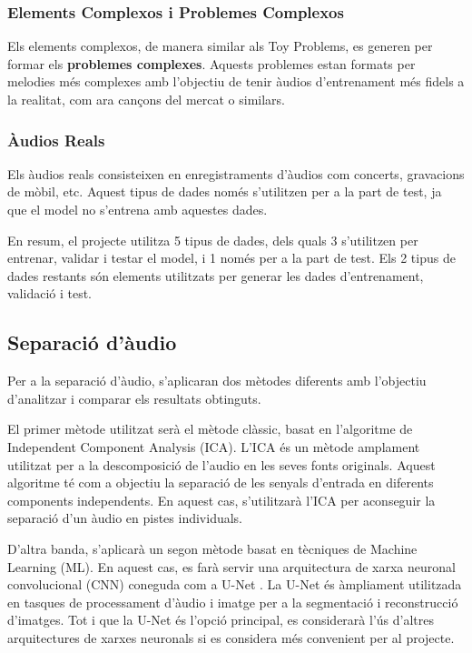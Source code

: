 \documentclass[10pt,a4paper,twocolumn,twoside]{article}
\begin{document}
\subsubsection{Elements Complexos i Problemes Complexos}

Els elements complexos, de manera similar als Toy Problems, es generen per formar els \textbf{problemes complexes}. Aquests problemes estan formats per melodies més complexes amb l'objectiu de tenir àudios d'entrenament més fidels a la realitat, com ara cançons del mercat o similars.

\subsubsection{Àudios Reals}

Els àudios reals consisteixen en enregistraments d'àudios com concerts, gravacions de mòbil, etc. Aquest tipus de dades només s'utilitzen per a la part de test, ja que el model no s'entrena amb aquestes dades.

En resum, el projecte utilitza 5 tipus de dades, dels quals 3 s'utilitzen per entrenar, validar i testar el model, i 1 només per a la part de test. Els 2 tipus de dades restants són elements utilitzats per generar les dades d'entrenament, validació i test.



\subsection{Separació d'àudio}

Per a la separació d'àudio, s'aplicaran dos mètodes diferents amb l'objectiu d'analitzar i comparar els resultats obtinguts.

El primer mètode utilitzat serà el mètode clàssic, basat en l'algoritme de Independent Component Analysis (ICA). L'ICA és un mètode amplament utilitzat per a la descomposició de l'audio en les seves fonts originals. Aquest algoritme té com a objectiu la separació de les senyals d'entrada en diferents components independents. En aquest cas, s'utilitzarà l'ICA per aconseguir la separació d'un àudio en pistes individuals.

D'altra banda, s'aplicarà un segon mètode basat en tècniques de Machine Learning (ML). En aquest cas, es farà servir una arquitectura de xarxa neuronal convolucional (CNN) coneguda com a U-Net \cite{spleeter2020}. La U-Net és àmpliament utilitzada en tasques de processament d'àudio i imatge per a la segmentació i reconstrucció d'imatges. Tot i que la U-Net és l'opció principal, es considerarà l'ús d'altres arquitectures de xarxes neuronals si es considera més convenient per al projecte.
\end{document}

